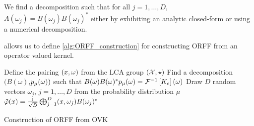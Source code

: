 \begin{remark}
We find a decomposition such that for all $j=1, \ldots, D$, $A(\omega_j)=B(\omega_j)B(\omega_j)^*$ either by exhibiting an analytic closed-form or using a numerical decomposition. 
\end{remark}
 allows us to define \cref{alg:ORFF_construction} for constructing \acs{ORFF} from an operator valued kernel.
\begin{center}
\begin{algorithm2e}[H]\label{alg:ORFF_construction}
	\SetAlgoLined
    \BlankLine
	Define the pairing $(x, \omega)$ from the \acs{LCA} group $(\mathcal{X}, \star)$\;
	Find a decomposition $(B(\omega)$,$p_{\mu}(\omega))$ such that $B(\omega)B(\omega)^*p_{\mu}(\omega)=\mathcal{F}^{-1}\left[K_e\right](\omega)$\;
	Draw $D$ random vectors $\omega_j$, $j=1, \hdots, D$ from the probability distribution $\mu$\;
   \Return $\tildePhi(x)=\frac{1}{\sqrt{D}}\Vect_{j=1}^D\pairing{x, \omega_j}B(\omega_j)^*$\;
   \caption{Construction of \acs{ORFF} from \acs{OVK}}
   \label{al:ORFF_construction}
\end{algorithm2e}
\end{center}

